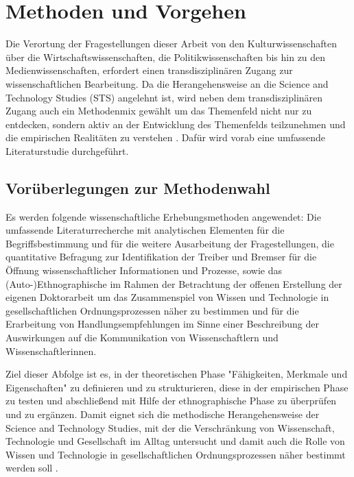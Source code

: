 \chapter{Methoden und Vorgehen}

Die Verortung der Fragestellungen dieser Arbeit von den Kulturwissenschaften über die Wirtschaftswissenschaften, die Politikwissenschaften bis hin zu den Medienwissenschaften, erfordert einen transdisziplinären Zugang zur wissenschaftlichen Bearbeitung. Da die Herangehensweise an die Science and Technology Studies (STS) angelehnt ist, wird neben dem transdisziplinären Zugang auch ein Methodenmix gewählt um das Themenfeld nicht nur zu entdecken, sondern aktiv an der Entwicklung des Themenfelds teilzunehmen \cite{MacKenzie_STS_1999} und die empirischen Realitäten zu verstehen \cite{kelty_2014_freedom}. Dafür wird vorab eine umfassende Literaturstudie durchgeführt.

\section{Vorüberlegungen zur Methodenwahl}

Es werden folgende wissenschaftliche Erhebungsmethoden angewendet: Die umfassende Literaturrecherche mit analytischen Elementen für die Begriffsbestimmung und für die weitere Ausarbeitung der Fragestellungen, die quantitative Befragung zur Identifikation der Treiber und Bremser für die Öffnung wissenschaftlicher Informationen und Prozesse, sowie das (Auto-)Ethnographische im Rahmen der Betrachtung der offenen Erstellung der eigenen Doktorarbeit um das Zusammenspiel von Wissen und Technologie in gesellschaftlichen Ordnungsprozessen näher zu bestimmen und für die Erarbeitung von Handlungsempfehlungen im Sinne einer Beschreibung der Auswirkungen auf die Kommunikation von Wissenschaftlern und Wissenschaftlerinnen.

Ziel dieser Abfolge ist es, in der theoretischen Phase "Fähigkeiten, Merkmale und Eigenschaften" \cite{raab_2012_fragebogen} zu definieren und zu strukturieren, diese in der empirischen Phase zu testen und abschließend mit Hilfe der ethnographische Phase zu überprüfen und zu ergänzen. Damit eignet sich die methodische Herangehensweise der Science and Technology Studies, mit der die Verschränkung von Wissenschaft, Technologie und Gesellschaft im Alltag untersucht und damit auch die Rolle von Wissen und Technologie in gesellschaftlichen Ordnungsprozessen näher bestimmt werden soll \cite{beck_2014_science}.

